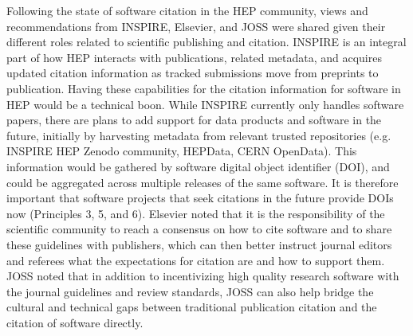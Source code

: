 Following the state of software citation in the HEP community, views and recommendations from INSPIRE, Elsevier, and JOSS were shared given their different roles related to scientific publishing and citation.
INSPIRE is an integral part of how HEP interacts with publications, related metadata, and acquires updated citation information as tracked submissions move from preprints to publication.
Having these capabilities for the citation information for software in HEP would be a technical boon.
While INSPIRE currently only handles software papers, there are plans to add support for data products and software in the future, initially by harvesting metadata from relevant trusted repositories (e.g. INSPIRE HEP Zenodo community, HEPData, CERN OpenData).
This information would be gathered by software digital object identifier (DOI), and could be aggregated across multiple releases of the same software.
It is therefore important that software projects that seek citations in the future provide DOIs now (Principles 3, 5, and 6).
Elsevier noted that it is the responsibility of the scientific community to reach a consensus on how to cite software and to share these guidelines with publishers, which can then better instruct journal editors and referees what the expectations for citation are and how to support them.
JOSS noted that in addition to incentivizing high quality research software with the journal guidelines and review standards, JOSS can also help bridge the cultural and technical gaps between traditional publication citation and the citation of software directly.
